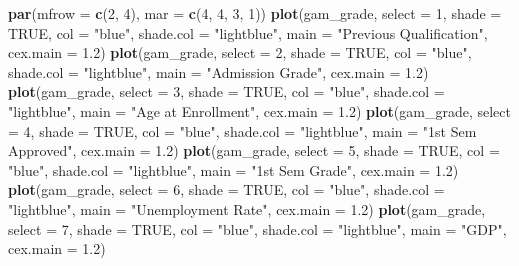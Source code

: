 \documentclass[
]{article}
\newenvironment{Shaded}{\begin{snugshade}}{\end{snugshade}}
\newcommand{\AttributeTok}[1]{\textcolor[rgb]{0.13,0.29,0.53}{#1}}
\newcommand{\ConstantTok}[1]{\textcolor[rgb]{0.56,0.35,0.01}{#1}}
\newcommand{\DecValTok}[1]{\textcolor[rgb]{0.00,0.00,0.81}{#1}}
\newcommand{\FloatTok}[1]{\textcolor[rgb]{0.00,0.00,0.81}{#1}}
\newcommand{\FunctionTok}[1]{\textcolor[rgb]{0.13,0.29,0.53}{\textbf{#1}}}
\newcommand{\NormalTok}[1]{#1}
\newcommand{\StringTok}[1]{\textcolor[rgb]{0.31,0.60,0.02}{#1}}
\begin{document}
\begin{Shaded}
\begin{Highlighting}[]
\FunctionTok{par}\NormalTok{(}\AttributeTok{mfrow =} \FunctionTok{c}\NormalTok{(}\DecValTok{2}\NormalTok{, }\DecValTok{4}\NormalTok{), }\AttributeTok{mar =} \FunctionTok{c}\NormalTok{(}\DecValTok{4}\NormalTok{, }\DecValTok{4}\NormalTok{, }\DecValTok{3}\NormalTok{, }\DecValTok{1}\NormalTok{))}
\FunctionTok{plot}\NormalTok{(gam\_grade, }\AttributeTok{select =} \DecValTok{1}\NormalTok{, }\AttributeTok{shade =} \ConstantTok{TRUE}\NormalTok{, }\AttributeTok{col =} \StringTok{"blue"}\NormalTok{, }\AttributeTok{shade.col =} \StringTok{"lightblue"}\NormalTok{,}
     \AttributeTok{main =} \StringTok{"Previous Qualification"}\NormalTok{, }\AttributeTok{cex.main =} \FloatTok{1.2}\NormalTok{)}
\FunctionTok{plot}\NormalTok{(gam\_grade, }\AttributeTok{select =} \DecValTok{2}\NormalTok{, }\AttributeTok{shade =} \ConstantTok{TRUE}\NormalTok{, }\AttributeTok{col =} \StringTok{"blue"}\NormalTok{, }\AttributeTok{shade.col =} \StringTok{"lightblue"}\NormalTok{,}
     \AttributeTok{main =} \StringTok{"Admission Grade"}\NormalTok{, }\AttributeTok{cex.main =} \FloatTok{1.2}\NormalTok{)}
\FunctionTok{plot}\NormalTok{(gam\_grade, }\AttributeTok{select =} \DecValTok{3}\NormalTok{, }\AttributeTok{shade =} \ConstantTok{TRUE}\NormalTok{, }\AttributeTok{col =} \StringTok{"blue"}\NormalTok{, }\AttributeTok{shade.col =} \StringTok{"lightblue"}\NormalTok{,}
     \AttributeTok{main =} \StringTok{"Age at Enrollment"}\NormalTok{, }\AttributeTok{cex.main =} \FloatTok{1.2}\NormalTok{)}
\FunctionTok{plot}\NormalTok{(gam\_grade, }\AttributeTok{select =} \DecValTok{4}\NormalTok{, }\AttributeTok{shade =} \ConstantTok{TRUE}\NormalTok{, }\AttributeTok{col =} \StringTok{"blue"}\NormalTok{, }\AttributeTok{shade.col =} \StringTok{"lightblue"}\NormalTok{,}
     \AttributeTok{main =} \StringTok{"1st Sem Approved"}\NormalTok{, }\AttributeTok{cex.main =} \FloatTok{1.2}\NormalTok{)}
\FunctionTok{plot}\NormalTok{(gam\_grade, }\AttributeTok{select =} \DecValTok{5}\NormalTok{, }\AttributeTok{shade =} \ConstantTok{TRUE}\NormalTok{, }\AttributeTok{col =} \StringTok{"blue"}\NormalTok{, }\AttributeTok{shade.col =} \StringTok{"lightblue"}\NormalTok{,}
     \AttributeTok{main =} \StringTok{"1st Sem Grade"}\NormalTok{, }\AttributeTok{cex.main =} \FloatTok{1.2}\NormalTok{)}
\FunctionTok{plot}\NormalTok{(gam\_grade, }\AttributeTok{select =} \DecValTok{6}\NormalTok{, }\AttributeTok{shade =} \ConstantTok{TRUE}\NormalTok{, }\AttributeTok{col =} \StringTok{"blue"}\NormalTok{, }\AttributeTok{shade.col =} \StringTok{"lightblue"}\NormalTok{,}
     \AttributeTok{main =} \StringTok{"Unemployment Rate"}\NormalTok{, }\AttributeTok{cex.main =} \FloatTok{1.2}\NormalTok{)}
\FunctionTok{plot}\NormalTok{(gam\_grade, }\AttributeTok{select =} \DecValTok{7}\NormalTok{, }\AttributeTok{shade =} \ConstantTok{TRUE}\NormalTok{, }\AttributeTok{col =} \StringTok{"blue"}\NormalTok{, }\AttributeTok{shade.col =} \StringTok{"lightblue"}\NormalTok{,}
     \AttributeTok{main =} \StringTok{"GDP"}\NormalTok{, }\AttributeTok{cex.main =} \FloatTok{1.2}\NormalTok{)}
\end{Highlighting}
\end{Shaded}
\end{document}

